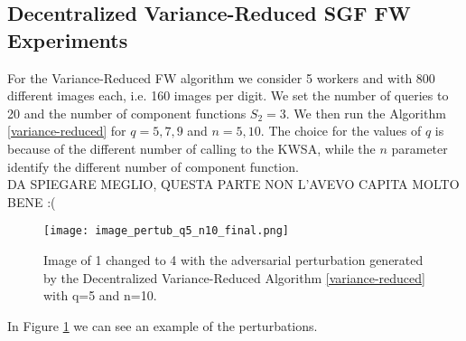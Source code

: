 \subsection{Decentralized Variance-Reduced SGF FW Experiments}
For the Variance-Reduced FW algorithm we consider 5 workers and with 800 different images each, i.e. 160 images per digit. We set the number of queries to 20 and the number of component functions $S_2 = 3$. We then run the Algorithm \ref{variance-reduced} for $q=5,7,9$ and $n=5,10$. The choice for the values of $q$ is because of the different number of calling to the KWSA, while the $n$ parameter identify the different number of component function.\\

DA SPIEGARE MEGLIO, QUESTA PARTE NON L'AVEVO CAPITA MOLTO BENE :(

\begin{figure}[htbp]
	\centering
	\texttt{[image: image\_pertub\_q5\_n10\_final.png]}
	\caption{Image of 1 changed to 4 with the adversarial perturbation generated by the Decentralized Variance-Reduced Algorithm \ref{variance-reduced} with q=5 and n=10.}
	\label{fig:variance-reduced}
\end{figure}
In Figure \ref{fig:variance-reduced} we can see an example of the perturbations.
